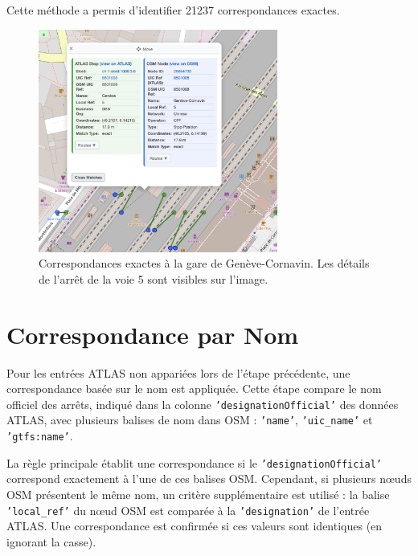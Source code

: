Cette méthode a permis d'identifier 21237 correspondances exactes.
\begin{figure}[h] 
    \centering
    \includegraphics[width=0.7\textwidth]{../figures/correspondances/exact_Cornavin.png}
    \caption[Correspondances exactes à Genève-Cornavin]{Correspondances exactes à la gare de Genève-Cornavin. Les détails de l'arrêt de la voie 5 sont visibles sur l'image.}
    \label{fig:exact_cornavin}
\end{figure}

\section{Correspondance par Nom}

Pour les entrées ATLAS non appariées lors de l’étape précédente, une correspondance basée sur le nom est appliquée. Cette étape compare le nom officiel des arrêts, indiqué dans la colonne \texttt{'designationOfficial'} des données ATLAS, avec plusieurs balises de nom dans OSM : \texttt{'name'}, \texttt{'uic\_name'} et \texttt{'gtfs:name'}.

La règle principale établit une correspondance si le \texttt{'designationOfficial'} correspond exactement à l’une de ces balises OSM. Cependant, si plusieurs nœuds OSM présentent le même nom, un critère supplémentaire est utilisé : la balise \texttt{'local\_ref'} du nœud OSM est comparée à la \texttt{'designation'} de l’entrée ATLAS. Une correspondance est confirmée si ces valeurs sont identiques (en ignorant la casse).

